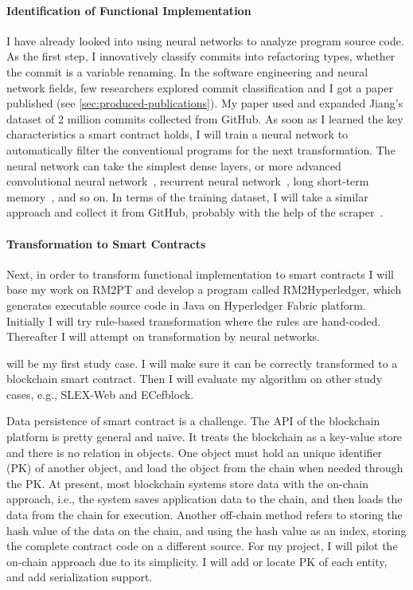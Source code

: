 \paragraph*{Identification of Functional Implementation}
I have already looked into using neural networks to analyze program source code.
As the first step, I innovatively classify commits into refactoring types, whether the commit is a variable renaming.
In the software engineering and neural network fields, few researchers explored commit classification and I got a paper published (see \autoref{sec:produced-publications}).
My paper used and expanded Jiang's dataset of 2 million commits collected from GitHub.
As soon as I learned the key characteristics a smart contract holds, I will train a neural network to automatically filter the conventional programs for the next transformation.
The neural network can take the simplest dense layers, or more advanced convolutional neural network~\cite{albawi2017understanding}, recurrent neural network~\cite{tarwani2017survey}, long short-term memory~\cite{skovajsova2017long}, and so on.
In terms of the training dataset, I will take a similar approach and collect it from GitHub, probably with the help of the scraper~\cite{alexandru2017replicating}.


\paragraph*{Transformation to Smart Contracts}
Next, in order to transform functional implementation to smart contracts
I will base my work on RM2PT and develop a program called RM2Hyperledger, which generates executable source code in Java on Hyperledger Fabric platform.
Initially I will try rule-based transformation where the rules are hand-coded. Thereafter I will attempt on transformation by neural networks.

{\cocome} will be my first study case. I will make sure it can be correctly transformed to a blockchain smart contract. Then I will evaluate my algorithm on other study cases, e.g., SLEX-Web and ECefblock.


Data persistence of smart contract is a challenge.
The API of the blockchain platform is pretty general and naive. It treats the blockchain as a key-value store and there is no relation in objects. One object must hold an unique identifier (PK) of another object, and load the object from the chain when needed through the PK.
At present, most blockchain systems store data with the on-chain approach, i.e., the system saves application data to the chain, and then loads the data from the chain for execution.
Another off-chain method refers to storing the hash value of the data on the chain, and using the hash value as an index, storing the complete contract code on a different source.
For my project, I will pilot the on-chain approach due to its simplicity. I will add or locate PK of each entity, and add serialization support.

